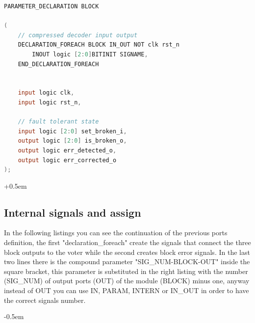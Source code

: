 {{\begin{parcolumns}[colwidths={1=0.54\textwidth}, distance=0.5em]{2}
{\begin{lstlisting}[basicstyle=\ttfamily\scriptsize, language=Verilog, caption=Travulog Code, label=lst:declTV]
	PARAMETER_DECLARATION BLOCK

(
	// compressed decoder input output
	DECLARATION_FOREACH BLOCK IN_OUT NOT clk rst_n
		INOUT logic [2:0]BITINIT SIGNAME,
	END_DECLARATION_FOREACH

	
	input logic clk,
	input logic rst_n,  
	
	// fault tolerant state
	input logic [2:0] set_broken_i,
	output logic [2:0] is_broken_o,
	output logic err_detected_o,
	output logic err_corrected_o
);
				\end{lstlisting}
			}
		\end{parcolumns}
	
		\openup +0.5em
		
		
	}%
		\subsection{Internal signals and assign}{
		In the following listings you can see the continuation of the previous ports definition, the first "declaration\_foreach" create the signals that connect the three block outputs to the voter while the second creates block error signals. In the last two lines there is the compound parameter "SIG\_NUM-BLOCK-OUT" inside the square bracket,  this parameter is substituted in the right listing with the number (SIG\_NUM) of output ports (OUT) of the module (BLOCK) minus one, anyway instead of OUT you can use IN, PARAM, INTERN or IN\_OUT in order to have the correct signals number.
		
		\openup -0.5em
		
		\begin{parcolumns}[colwidths={1=0.5\textwidth}, distance=0.5em]{2}
\end{parcolumns}}}
